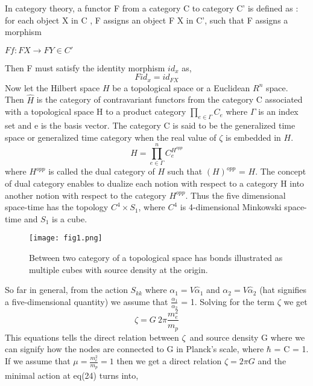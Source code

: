 \documentclass{article}
\begin{document}
In category theory, a functor F from a category C to category C' is defined as : for each object X in C , F assigns an object F X in C', such that F assigns a morphism 
\begin{center}
\begin{math}
  Ff: FX \rightarrow FY \in C'
\end{math}
\end{center}
 Then F must satisfy the identity morphism $id_x$ as,
\begin{equation}
     F id_x = id_{FX} 
\end{equation}
Now let the Hilbert space $H$ be a topological space or a Euclidean $R^n$ space. Then $\hat H$ is the category of contravariant functors from the category C associated with a topological space H to a product category $\prod_{e\in \Gamma} C_{e}$ where $\Gamma$ is an index set and e is the basis vector. The category C is said to be the generalized time space or generalized time category when the real value of $\zeta$ is embedded in $H$.
\begin{equation}
    \hat H = \prod_{e \in \Gamma}^n C_{e}^{H^{opp}} 
\end{equation} where $H^{opp}$ is called the dual category of $H$ such that $(H)^{opp}$ = $H$. The concept of dual category enables to dualize each notion with respect to a category H into another notion with respect to the category $H^{opp}$.
Thus the five dimensional space-time has the topology $C^4 \times S_1$, where $C^4$ is 4-dimensional Minkowski space-time and $S_1$ is a cube.
\begin{figure}[ht]
    \centering
     \texttt{[image: fig1.png]}
       \caption{Between two category of a topological space has bonds illustrated as multiple cubes with source density at the origin.}
     \label{fig:my_label}
\end{figure}
So far in general, from the action $S_{kk}$ where \begin{math}
\alpha_1 = V \hat \alpha_1
\end{math}
and \begin{math}
\alpha_2 = V \hat \alpha_2
\end{math} (hat signifies a five-dimensional quantity) we assume that $\frac{\alpha_1}{\alpha_2}$ = 1. Solving for the term $\zeta$ we get \begin{equation}
     \zeta = G \ 2\pi \frac{m_e^2}{m_p} 
\end{equation}
This equations tells the direct relation between $\zeta$\ and source density G where we can signify how the nodes are connected to G in Planck's scale, where $\hbar$ = C = 1. If we assume that $\mu = \frac{m_e^2}{m_p} = 1$ then we get a direct relation $\zeta = 2 \pi G$ and the minimal action at eq(24) turns into,
\end{document}
